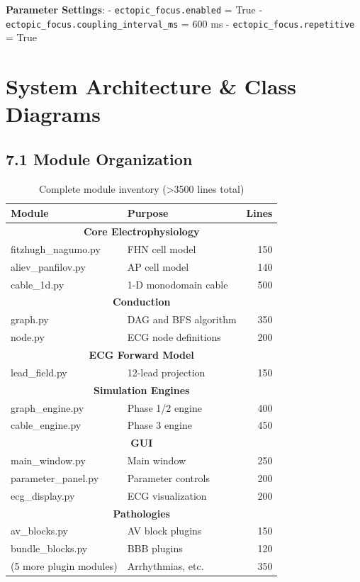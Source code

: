 \documentclass[12pt,oneside,a4paper]{book}
\newcommand{\code}[1]{\texttt{#1}}
\begin{document}
\textbf{Parameter Settings}:
- \code{ectopic\_focus.enabled} = True
- \code{ectopic\_focus.coupling\_interval\_ms} = 600 ms
- \code{ectopic\_focus.repetitive} = True


\chapter{System Architecture \& Class Diagrams}

\section{7.1 Module Organization}

\begin{table}[H]
\centering
\begin{tabularx}{\textwidth}{|l|X|r|}
\hline
\textbf{Module} & \textbf{Purpose} & \textbf{Lines} \\
\hline
\multicolumn{3}{|c|}{\textbf{Core Electrophysiology}} \\
\hline
fitzhugh\_nagumo.py & FHN cell model & 150 \\
aliev\_panfilov.py & AP cell model & 140 \\
cable\_1d.py & 1-D monodomain cable & 500 \\
\hline
\multicolumn{3}{|c|}{\textbf{Conduction}} \\
\hline
graph.py & DAG and BFS algorithm & 350 \\
node.py & ECG node definitions & 200 \\
\hline
\multicolumn{3}{|c|}{\textbf{ECG Forward Model}} \\
\hline
lead\_field.py & 12-lead projection & 150 \\
\hline
\multicolumn{3}{|c|}{\textbf{Simulation Engines}} \\
\hline
graph\_engine.py & Phase 1/2 engine & 400 \\
cable\_engine.py & Phase 3 engine & 450 \\
\hline
\multicolumn{3}{|c|}{\textbf{GUI}} \\
\hline
main\_window.py & Main window & 250 \\
parameter\_panel.py & Parameter controls & 200 \\
ecg\_display.py & ECG visualization & 200 \\
\hline
\multicolumn{3}{|c|}{\textbf{Pathologies}} \\
\hline
av\_blocks.py & AV block plugins & 150 \\
bundle\_blocks.py & BBB plugins & 120 \\
(5 more plugin modules) & Arrhythmias, etc. & 350 \\
\hline
\end{tabularx}
\caption{Complete module inventory (\textgreater 3500 lines total)}
\label{tab:modules}
\end{table}
\end{document}
